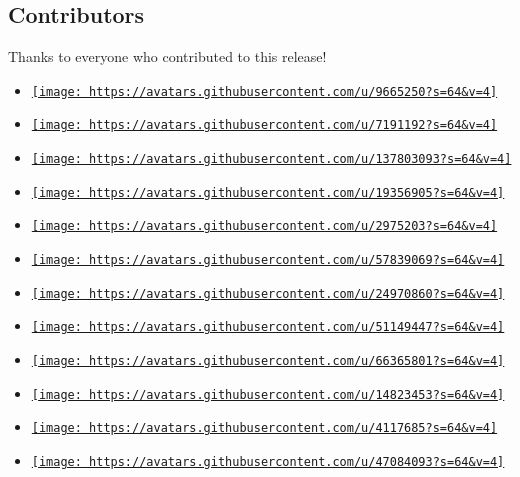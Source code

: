 \subsection{Contributors}\label{contributors}

Thanks to everyone who contributed to this release!

\begin{itemize}
\tightlist
\item
  \href{https://github.com/Dherse}{\texttt{[image: https://avatars.githubusercontent.com/u/9665250?s=64\&v=4]}}
\item
  \href{https://github.com/EpicEricEE}{\texttt{[image: https://avatars.githubusercontent.com/u/7191192?s=64\&v=4]}}
\item
  \href{https://github.com/tingerrr}{\texttt{[image: https://avatars.githubusercontent.com/u/137803093?s=64\&v=4]}}
\item
  \href{https://github.com/LuxxxLucy}{\texttt{[image: https://avatars.githubusercontent.com/u/19356905?s=64\&v=4]}}
\item
  \href{https://github.com/bluebear94}{\texttt{[image: https://avatars.githubusercontent.com/u/2975203?s=64\&v=4]}}
\item
  \href{https://github.com/MDLC01}{\texttt{[image: https://avatars.githubusercontent.com/u/57839069?s=64\&v=4]}}
\item
  \href{https://github.com/Jollywatt}{\texttt{[image: https://avatars.githubusercontent.com/u/24970860?s=64\&v=4]}}
\item
  \href{https://github.com/SekoiaTree}{\texttt{[image: https://avatars.githubusercontent.com/u/51149447?s=64\&v=4]}}
\item
  \href{https://github.com/DVDTSB}{\texttt{[image: https://avatars.githubusercontent.com/u/66365801?s=64\&v=4]}}
\item
  \href{https://github.com/HydroH}{\texttt{[image: https://avatars.githubusercontent.com/u/14823453?s=64\&v=4]}}
\item
  \href{https://github.com/KillTheMule}{\texttt{[image: https://avatars.githubusercontent.com/u/4117685?s=64\&v=4]}}
\item
  \href{https://github.com/LaurenzV}{\texttt{[image: https://avatars.githubusercontent.com/u/47084093?s=64\&v=4]}}

\end{itemize}
